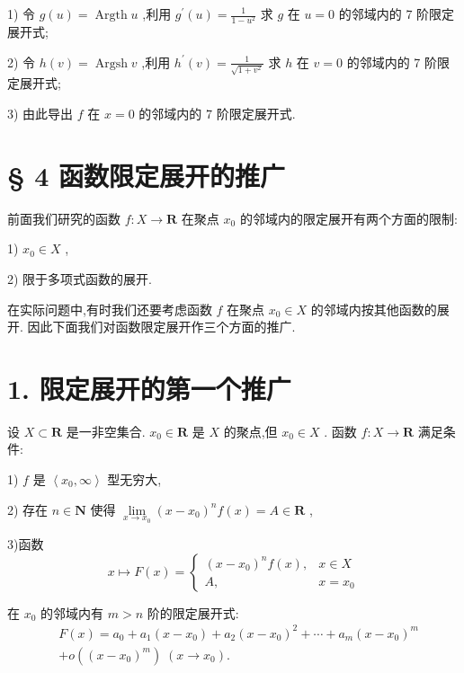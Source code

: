1) 令 $g\left( u\right)  = \operatorname{Argth}u$ ,利用 ${g}^{\prime }\left( u\right)  = \frac{1}{1 - {u}^{2}}$ 求 $g$ 在 $u = 0$ 的邻域内的 7 阶限定展开式;

2) 令 $h\left( v\right)  = \operatorname{Argsh}v$ ,利用 ${h}^{\prime }\left( v\right)  = \frac{1}{\sqrt{1 + {v}^{2}}}$ 求 $h$ 在 $v = 0$ 的邻域内的 7 阶限定展开式;

3) 由此导出 $f$ 在 $x = 0$ 的邻域内的 7 阶限定展开式.

\section*{§ 4 函数限定展开的推广}

前面我们研究的函数 $f : X \rightarrow  \mathbf{R}$ 在聚点 ${x}_{0}$ 的邻域内的限定展开有两个方面的限制:

1) ${x}_{0} \in  X$ ,

2) 限于多项式函数的展开.

在实际问题中,有时我们还要考虑函数 $f$ 在聚点 ${x}_{0} \in  X$ 的邻域内按其他函数的展开. 因此下面我们对函数限定展开作三个方面的推广.

\section*{1. 限定展开的第一个推广}

设 $X \subset  \mathbf{R}$ 是一非空集合. ${x}_{0} \in  \mathbf{R}$ 是 $X$ 的聚点,但 ${x}_{0} \in  X$ . 函数 $f : X \rightarrow  \mathbf{R}$ 满足条件:

1) $f$ 是 $\left\langle  {{x}_{0},\infty }\right\rangle$ 型无穷大,

2) 存在 $n \in  \mathbf{N}$ 使得 $\mathop{\lim }\limits_{{x \rightarrow  {x}_{0}}}{\left( x - {x}_{0}\right) }^{n}f\left( x\right)  = A \in  \mathbf{R}$ ,

3)函数
$$x \mapsto  F\left( x\right)  = \left\{  \begin{array}{ll} {\left( x - {x}_{0}\right) }^{n}f\left( x\right) , & x \in  X \\  A, & x = {x}_{0} \end{array}\right.$$

在 ${x}_{0}$ 的邻域内有 $m > n$ 阶的限定展开式:
\begin{align*}
	&F\left( x\right)  = {a}_{0} + {a}_{1}\left( {x - {x}_{0}}\right)  + {a}_{2}{\left( x - {x}_{0}\right) }^{2} + \cdots  + {a}_{m}{\left( x - {x}_{0}\right) }^{m}\\
	&+ o\left( {\left( x - {x}_{0}\right) }^{m}\right) \;\left( {x \rightarrow  {x}_{0}}\right) .
\end{align*}

